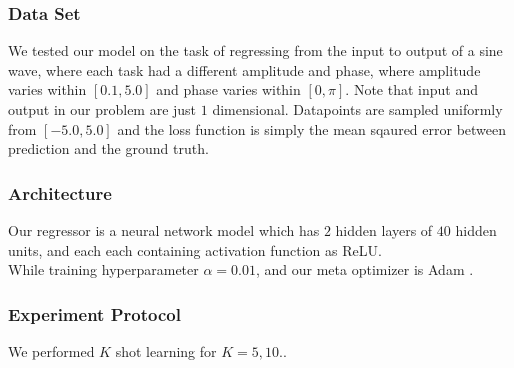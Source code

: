 \documentclass[a4paper]{article}
\begin{document}
\subsubsection{Data Set}
We tested our model on the task of regressing from the input to output of a sine wave,
where each task had a different amplitude and phase, where amplitude varies within $[0.1, 5.0]$ and phase varies within $[0, \pi]$. 
Note that input and output in our problem are just $1$ dimensional. 
Datapoints are sampled uniformly from $[-5.0, 5.0]$ and the loss function is simply the mean sqaured error between prediction and the ground truth.

\subsubsection{Architecture}
Our regressor is a neural network model which has $2$ hidden layers of $40$ hidden units, and each each containing activation function as ReLU. \\
While training hyperparameter $\alpha = 0.01$, and our meta optimizer is Adam \cite{adam}. 

\subsubsection{Experiment Protocol}
We performed $K$ shot learning for $K = 5, 10.$.
\end{document}
